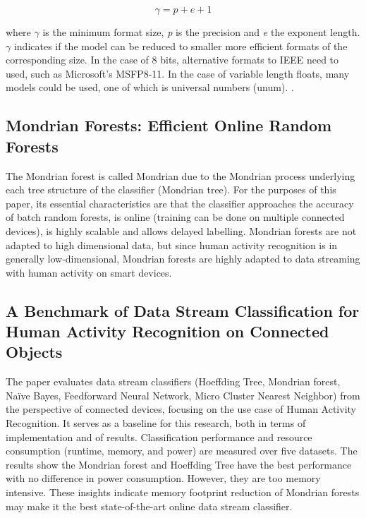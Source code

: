 \documentclass[conference]{IEEEtran}
\newcommand{\Yohan}[1]{\todo[inline,backgroundcolor=green]{YC: #1}}
\begin{document}
\begin{equation}
    \gamma=p+e+1\label{eq}
\end{equation}

where $\gamma$ is the minimum format size, \textit{p} is the precision and
\textit{e} the exponent length. $\gamma$ indicates if the model can be reduced
to smaller more efficient formats of the corresponding size.
\cite{chatelain2019automatic} In the case of 8 bits, alternative formats to IEEE
need to used, such as Microsoft’s MSFP8-11. \cite{chung2018serving} In the case
of variable length floats, many models could be used, one of which is universal
numbers (unum). \cite{gustafson2017beating}.

\subsection{Mondrian Forests: Efficient Online Random Forests}

The Mondrian forest is called Mondrian due to the Mondrian process underlying
each tree structure of the classifier (Mondrian tree). For the purposes of this
paper, its essential characteristics are that the classifier approaches the
accuracy of batch random forests, is online (training can be done on multiple
connected devices), is highly scalable and allows delayed labelling. \cite{b1}
\Yohan{Reference is missing.}
Mondrian forests are not adapted to high dimensional data, but since human
activity recognition is in generally low-dimensional, Mondrian forests are
highly adapted to data streaming with human activity on smart devices.

\subsection{A Benchmark of Data Stream Classification for Human Activity Recognition on Connected Objects}

The paper \cite{khannouz2020benchmark} evaluates data stream classifiers
(Hoeffding Tree, Mondrian forest, Naïve Bayes, Feedforward Neural Network, Micro
Cluster Nearest Neighbor) from the perspective of connected devices, focusing on
the use case of Human Activity Recognition. It serves as a baseline for this
research, both in terms of implementation and of results.  Classification
performance and resource consumption (runtime, memory, and power) are measured
over five datasets. The results show the Mondrian forest and Hoeffding Tree have
the best performance with no difference in power consumption. However, they are
too memory intensive. These insights indicate memory footprint reduction of
Mondrian forests may make it the best state-of-the-art online data stream
classifier.
\end{document}
